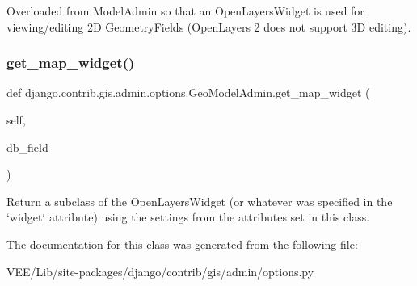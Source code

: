 \begin{DoxyVerb}Overloaded from ModelAdmin so that an OpenLayersWidget is used
for viewing/editing 2D GeometryFields (OpenLayers 2 does not support
3D editing).
\end{DoxyVerb}
 \mbox{\label{classdjango_1_1contrib_1_1gis_1_1admin_1_1options_1_1_geo_model_admin_ae1f436e3ad0b6505b0a10c91f5484f32}} 
\subsubsection{\texorpdfstring{get\+\_\+map\+\_\+widget()}{get\_map\_widget()}}
{\footnotesize\ttfamily def django.\+contrib.\+gis.\+admin.\+options.\+Geo\+Model\+Admin.\+get\+\_\+map\+\_\+widget (\begin{DoxyParamCaption}\item[{}]{self,  }\item[{}]{db\+\_\+field }\end{DoxyParamCaption})}

\begin{DoxyVerb}Return a subclass of the OpenLayersWidget (or whatever was specified
in the `widget` attribute) using the settings from the attributes set
in this class.
\end{DoxyVerb}
 

The documentation for this class was generated from the following file\+:\begin{DoxyCompactItemize}
\item 
V\+E\+E/\+Lib/site-\/packages/django/contrib/gis/admin/options.\+py\end{DoxyCompactItemize}

